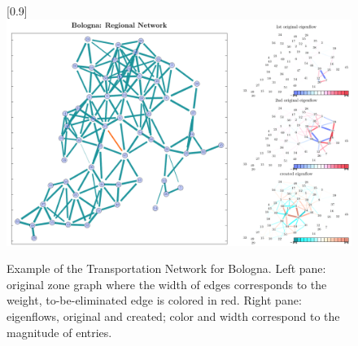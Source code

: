 \begin{figure}
    \centering
    \scalebox{1.0}[0.9]{\includegraphics[width=1.0\columnwidth]{figures/julia/bologna.pdf}}
    \caption{Example of the Transportation Network for Bologna. Left pane: original zone graph where the width of edges corresponds to the weight, to-be-eliminated edge is colored in red. Right pane: eigenflows, original and created; color and width correspond to the magnitude of entries.}
    \label{fig:bologna}
\end{figure}


